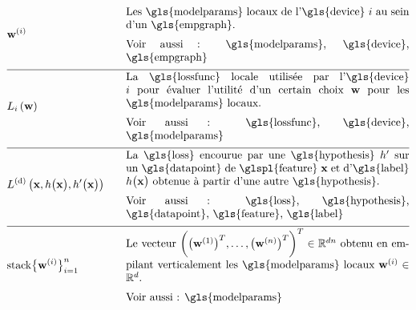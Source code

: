 \begin{align}
	&\localparams{\nodeidx} & \quad & \parbox{.75\textwidth}{
		Les \gls{modelparams} locaux de l'\gls{device} $\nodeidx$ au sein d’un \gls{empgraph}. \\
		[2mm] Voir aussi : \gls{modelparams}, \gls{device}, \gls{empgraph}
	} \nonumber \\[2mm] \hline \nonumber\\[-5mm]
	&\locallossfunc{\nodeidx}{\weights} & \quad & \parbox{.75\textwidth}{
		La \gls{lossfunc} locale utilisée par l'\gls{device} $\nodeidx$ pour évaluer l’utilité d’un certain choix $\weights$ pour les \gls{modelparams} locaux. \\
		[2mm] Voir aussi : \gls{lossfunc}, \gls{device}, \gls{modelparams}
	} \nonumber \\[2mm] \hline \nonumber\\[-5mm]
	&\gtvloss{\featurevec}{\hypothesis\big(\featurevec\big)}{\hypothesis'\big(\featurevec\big)} & \quad & \parbox{.75\textwidth}{
		La \gls{loss} encourue par une \gls{hypothesis} $\hypothesis'$ sur un \gls{datapoint} de \glspl{feature} $\featurevec$ et d'\gls{label} $\hypothesis\big( \featurevec\big)$ obtenue à partir d’une autre \gls{hypothesis}. \\
		[2mm] Voir aussi : \gls{loss}, \gls{hypothesis}, \gls{datapoint}, \gls{feature}, \gls{label}
	} \nonumber \\[2mm] \hline \nonumber\\[-5mm]
	&{\rm stack} \big\{ \weights^{(\nodeidx)} \big\}_{\nodeidx=1}^{\nrnodes} & \quad & \parbox{.75\textwidth}{
		Le vecteur $\bigg( \big(\weights^{(1)}  \big)^{T}, \ldots, \big(\weights^{(\nrnodes)}  \big)^{T} \bigg)^{T} \in \mathbb{R}^{\dimlocalmodel\nrnodes}$ obtenu en empilant verticalement les \gls{modelparams} locaux $\weights^{(\nodeidx)} \in \mathbb{R}^{\dimlocalmodel}$. \\
		[2mm] Voir aussi : \gls{modelparams}
	} \nonumber
\end{align}


